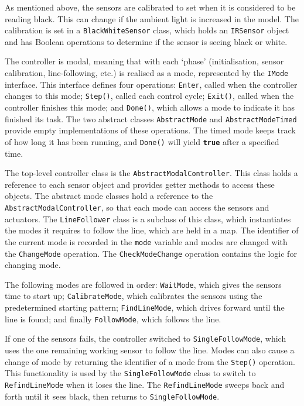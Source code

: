 As mentioned above, the sensors are calibrated to set when it is considered to be reading black. This can change if the ambient light is increased in the model. The calibration is set in a \texttt{BlackWhiteSensor} class, which holds an \texttt{IRSensor} object and has Boolean operations to determine if the sensor is seeing black or white.

The controller is modal, meaning that with each `phase' (initialisation, sensor calibration, line-following, etc.) is realised as a mode, represented by the \texttt{IMode} interface. This interface defines four operations: \texttt{Enter}, called when the controller changes to this mode; \texttt{Step()}, called each control cycle; \texttt{Exit()}, called when the controller finishes this mode; and \texttt{Done()}, which allows a mode to indicate it has finished its task. The two abstract classes \texttt{AbstractMode} and \texttt{AbstractModeTimed} provide empty implementations of these operations. The timed mode keeps track of how long it has been running, and \texttt{Done()} will yield \texttt{\textbf{true}} after a specified time.

The top-level controller class is the \texttt{AbstractModalController}. This class holds a reference to each sensor object and provides getter methods to access these objects. The abstract mode classes hold a reference to the \texttt{AbstractModalController}, so that each mode can access the sensors and actuators. The \texttt{LineFollower} class is a subclass of this class, which instantiates the modes it requires to follow the line, which are held in a map. The identifier of the current mode is recorded in the \texttt{mode} variable and modes are changed with the \texttt{ChangeMode} operation. The \texttt{CheckModeChange} operation contains the logic for changing mode.

The following modes are followed in order: \texttt{WaitMode}, which gives the sensors time to start up; \texttt{CalibrateMode}, which calibrates the sensors using the predetermined starting pattern; \texttt{FindLineMode}, which drives forward until the line is found; and finally \texttt{FollowMode}, which follows the line.

If one of the sensors fails, the controller switched to  \texttt{SingleFollowMode}, which uses the one remaining working sensor to follow the line. Modes can also cause a change of mode by returning the identifier of a mode from the \texttt{Step()} operation. This functionality is used by the \texttt{SingleFollowMode} class to switch to \texttt{RefindLineMode} when it loses the line. The \texttt{RefindLineMode} sweeps back and forth until it sees black, then returns to \texttt{Single\-Follow\-Mode}.

